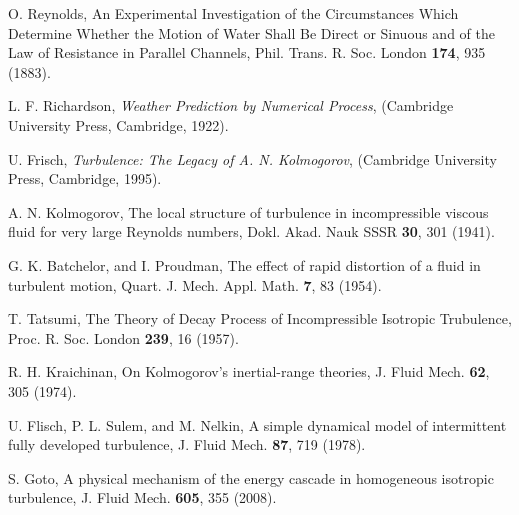 \documentclass[aps,onecolumn,pra,longbibliography]{revtex4}
\begin{document}
	\begin{thebibliography}{99}
		O. Reynolds,
		An Experimental Investigation of the Circumstances Which Determine
		Whether the Motion of Water Shall Be Direct or Sinuous
		and of the Law of Resistance in Parallel Channels,
		Phil. Trans. R. Soc. London \textbf{174}, 935 (1883).

		L. F. Richardson,
		{\it Weather Prediction by Numerical Process},
		(Cambridge University Press, Cambridge, 1922).

		U. Frisch, {\it Turbulence: The Legacy of A. N. Kolmogorov},
		(Cambridge University Press, Cambridge, 1995).

		A. N. Kolmogorov,
		The local structure of turbulence
		in incompressible viscous fluid for very large Reynolds numbers,
		Dokl. Akad. Nauk SSSR \textbf{30}, 301 (1941).

		G. K. Batchelor, and I. Proudman,
		The effect of rapid distortion of a fluid in turbulent motion,
		Quart. J. Mech. Appl. Math. \textbf{7}, 83 (1954).

		T. Tatsumi,
		The Theory of Decay Process of Incompressible Isotropic Trubulence,
		Proc. R. Soc. London \textbf{239}, 16 (1957).

    	R. H. Kraichinan,
    	On Kolmogorov's inertial-range theories,
    	J. Fluid Mech. \textbf{62}, 305 (1974).

		U. Flisch, P. L. Sulem, and M. Nelkin,
		A simple dynamical model of intermittent fully developed turbulence,
		J. Fluid Mech. \textbf{87}, 719 (1978).

        S. Goto,
        A physical mechanism of the energy cascade
		in homogeneous isotropic turbulence,
        J. Fluid Mech. \textbf{605}, 355 (2008).


\end{thebibliography}
\end{document}
